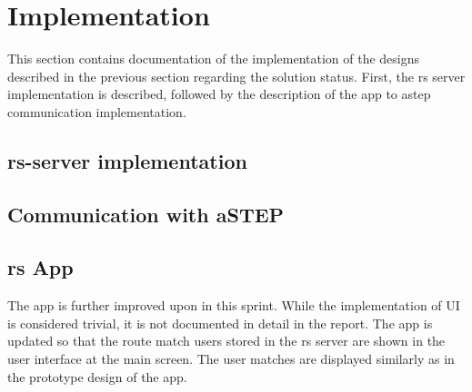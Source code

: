 \section{Implementation}
This section contains documentation of the implementation of the designs described in the previous section regarding the solution status.
First, the \gls{rs} server implementation is described, followed by the description of the app to \gls{astep} communication implementation.

\subsection{\gls{rs}-server implementation}


\subsection{Communication with aSTEP}


\subsection{\gls{rs} App}
The app is further improved upon in this sprint.
While the implementation of UI is considered trivial, it is not documented in detail in the report.
The app is updated so that the route match users stored in the \gls{rs} server are shown in the user interface at the main screen.
The user matches are displayed similarly as in the prototype design of the app.